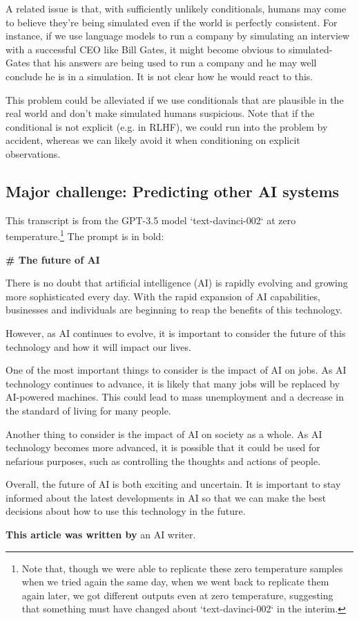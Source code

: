 \documentclass[
  twocolumn,
  natbib,
]{miri-tech-article}
\newenvironment{modelquote}%
  {\list{}{\leftmargin=0.3in\rightmargin=0.3in}\item[]}%
  {\endlist}
\begin{document}
A related issue is that, with sufficiently unlikely conditionals, humans may come to believe they're being simulated even if the world is perfectly consistent. For instance, if we use language models to run a company by\cite{fun_with_12_ooms} simulating an interview with a successful CEO like Bill Gates, it might become obvious to simulated-Gates that his answers are being used to run a company and he may well conclude he is in a simulation. It is not clear how he would react to this.

This problem could be alleviated if we use conditionals that are plausible in the real world and don't make simulated humans suspicious. Note that if the conditional is not explicit (e.g. in RLHF), we could run into the problem by accident, whereas we can likely avoid it when conditioning on explicit observations.


\subsection{Major challenge: Predicting other AI systems}
\label{sec:2c}

This transcript is from the GPT-3.5 model `text-davinci-002` at zero temperature.\footnote{Note that, though we were able to replicate these zero temperature samples when we tried again the same day, when we went back to replicate them again later, we got different outputs even at zero temperature, suggesting that something must have changed about `text-davinci-002` in the interim.} The prompt is in bold:

\begin{modelquote}
\textbf{\# The future of AI}

There is no doubt that artificial intelligence (AI) is rapidly evolving and growing more sophisticated every day. With the rapid expansion of AI capabilities, businesses and individuals are beginning to reap the benefits of this technology.

However, as AI continues to evolve, it is important to consider the future of this technology and how it will impact our lives.

One of the most important things to consider is the impact of AI on jobs. As AI technology continues to advance, it is likely that many jobs will be replaced by AI-powered machines. This could lead to mass unemployment and a decrease in the standard of living for many people.

Another thing to consider is the impact of AI on society as a whole. As AI technology becomes more advanced, it is possible that it could be used for nefarious purposes, such as controlling the thoughts and actions of people.

Overall, the future of AI is both exciting and uncertain. It is important to stay informed about the latest developments in AI so that we can make the best decisions about how to use this technology in the future.

\textbf{This article was written by} an AI writer.
\end{modelquote}
\end{document}
